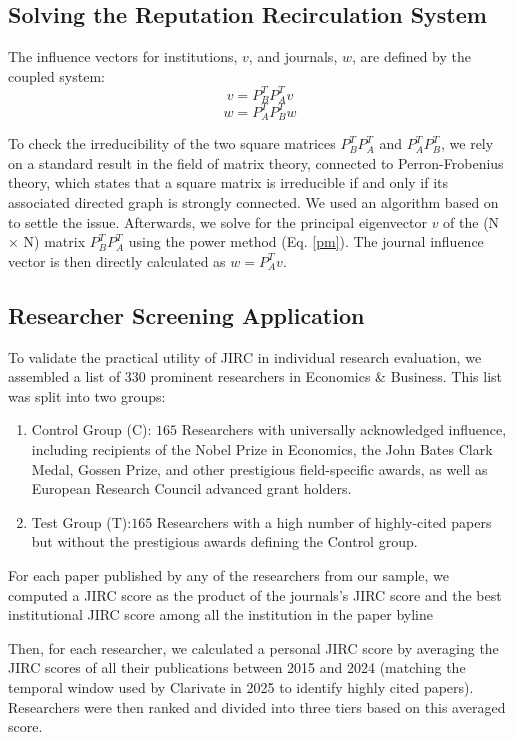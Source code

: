 \documentclass[10pt]{article}
\begin{document}
\subsection{Solving the Reputation Recirculation System}
The influence vectors for institutions, $v$, and journals, $w$, are defined by the coupled system:
\[ v = P_B^T P_A^T v \]
\[ w = P_A^T P_B^T w \]

To check the irreducibility of the two square matrices \(P_B^T P_A^T\) and \(P_A^T P_B^T\), we rely on a standard result in the field of matrix theory, connected to Perron-Frobenius theory, which states that a square matrix is irreducible if and only if its associated directed graph is strongly connected. We  used an algorithm based on \cite{Dijkstra} to settle the issue. Afterwards,
we solve for the principal eigenvector $v$ of the (N × N) matrix \(P_B^T P_A^T\) using the power method (Eq. \ref{pm}). The journal influence vector is then directly calculated as \(w = P_A^T v\).

\subsection{Researcher Screening Application}
To validate the practical utility of JIRC in individual research evaluation, we assembled a list of  330 prominent researchers in Economics \& Business. This list was split into two groups:
\begin{enumerate}
  \item Control Group (C): $165$ Researchers with universally acknowledged influence, including recipients of the Nobel Prize in Economics, the John Bates Clark Medal, Gossen Prize, and other prestigious field-specific awards, as well as European Research Council advanced grant holders.
  \item Test Group (T):$165$ Researchers with a high number of highly-cited papers but without the prestigious awards defining the Control group.
\end{enumerate}
For each paper published by any of the researchers from our sample, we computed a JIRC score as the product of the journals's JIRC score and the best institutional JIRC score among all the institution in the paper byline

Then, for each researcher, we calculated a personal JIRC score by averaging the JIRC scores of all their publications between 2015 and 2024 (matching the  temporal window used by Clarivate in 2025 to identify highly cited papers). Researchers were then ranked and divided into three tiers based on this averaged score.
\end{document}
